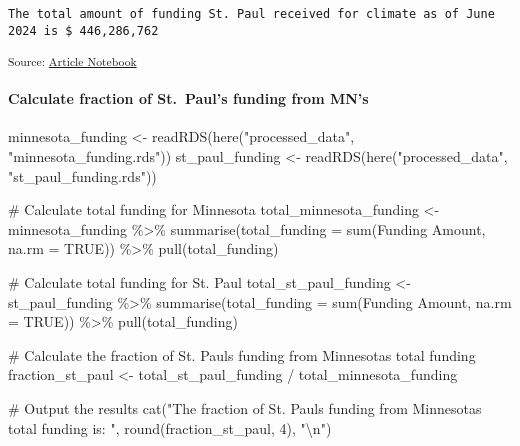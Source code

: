 \documentclass[
  letterpaper,
  DIV=11,
  numbers=noendperiod]{scrartcl}
\let\oldparagraph\paragraph
\renewcommand{\paragraph}[1]{\oldparagraph{#1}\mbox{}}
\newenvironment{Shaded}{\begin{snugshade}}{\end{snugshade}}
\newcommand{\AttributeTok}[1]{\textcolor[rgb]{0.40,0.45,0.13}{#1}}
\newcommand{\CommentTok}[1]{\textcolor[rgb]{0.37,0.37,0.37}{#1}}
\newcommand{\ConstantTok}[1]{\textcolor[rgb]{0.56,0.35,0.01}{#1}}
\newcommand{\DecValTok}[1]{\textcolor[rgb]{0.68,0.00,0.00}{#1}}
\newcommand{\FunctionTok}[1]{\textcolor[rgb]{0.28,0.35,0.67}{#1}}
\newcommand{\NormalTok}[1]{\textcolor[rgb]{0.00,0.23,0.31}{#1}}
\newcommand{\OtherTok}[1]{\textcolor[rgb]{0.00,0.23,0.31}{#1}}
\newcommand{\SpecialCharTok}[1]{\textcolor[rgb]{0.37,0.37,0.37}{#1}}
\newcommand{\StringTok}[1]{\textcolor[rgb]{0.13,0.47,0.30}{#1}}
\begin{document}
\begin{verbatim}
The total amount of funding St. Paul received for climate as of June 2024 is $ 446,286,762 
\end{verbatim}

\textsubscript{Source:
\href{https://beeckcenter.github.io/climate-equity-workforce/index-preview.html}{Article
Notebook}}

\paragraph{Calculate fraction of St.~Paul's funding from
MN's}\label{calculate-fraction-of-st.-pauls-funding-from-mns}

\begin{Shaded}
\begin{Highlighting}[]
\NormalTok{minnesota\_funding }\OtherTok{\textless{}{-}} \FunctionTok{readRDS}\NormalTok{(}\FunctionTok{here}\NormalTok{(}\StringTok{"processed\_data"}\NormalTok{, }\StringTok{"minnesota\_funding.rds"}\NormalTok{))}
\NormalTok{st\_paul\_funding }\OtherTok{\textless{}{-}} \FunctionTok{readRDS}\NormalTok{(}\FunctionTok{here}\NormalTok{(}\StringTok{"processed\_data"}\NormalTok{, }\StringTok{"st\_paul\_funding.rds"}\NormalTok{))}

\CommentTok{\# Calculate total funding for Minnesota}
\NormalTok{total\_minnesota\_funding }\OtherTok{\textless{}{-}}\NormalTok{ minnesota\_funding }\SpecialCharTok{\%\textgreater{}\%}
  \FunctionTok{summarise}\NormalTok{(}\AttributeTok{total\_funding =} \FunctionTok{sum}\NormalTok{(}\StringTok{\textasciigrave{}}\AttributeTok{Funding Amount}\StringTok{\textasciigrave{}}\NormalTok{, }\AttributeTok{na.rm =} \ConstantTok{TRUE}\NormalTok{)) }\SpecialCharTok{\%\textgreater{}\%}
  \FunctionTok{pull}\NormalTok{(total\_funding)}

\CommentTok{\# Calculate total funding for St. Paul}
\NormalTok{total\_st\_paul\_funding }\OtherTok{\textless{}{-}}\NormalTok{ st\_paul\_funding }\SpecialCharTok{\%\textgreater{}\%}
  \FunctionTok{summarise}\NormalTok{(}\AttributeTok{total\_funding =} \FunctionTok{sum}\NormalTok{(}\StringTok{\textasciigrave{}}\AttributeTok{Funding Amount}\StringTok{\textasciigrave{}}\NormalTok{, }\AttributeTok{na.rm =} \ConstantTok{TRUE}\NormalTok{)) }\SpecialCharTok{\%\textgreater{}\%}
  \FunctionTok{pull}\NormalTok{(total\_funding)}

\CommentTok{\# Calculate the fraction of St. Paul\textquotesingle{}s funding from Minnesota\textquotesingle{}s total funding}
\NormalTok{fraction\_st\_paul }\OtherTok{\textless{}{-}}\NormalTok{ total\_st\_paul\_funding }\SpecialCharTok{/}\NormalTok{ total\_minnesota\_funding}

\CommentTok{\# Output the results}
\FunctionTok{cat}\NormalTok{(}\StringTok{"The fraction of St. Paul\textquotesingle{}s funding from Minnesota\textquotesingle{}s total funding is: "}\NormalTok{, }
    \FunctionTok{round}\NormalTok{(fraction\_st\_paul, }\DecValTok{4}\NormalTok{), }\StringTok{"}\SpecialCharTok{\textbackslash{}n}\StringTok{"}\NormalTok{)}
\end{Highlighting}
\end{Shaded}
\end{document}
